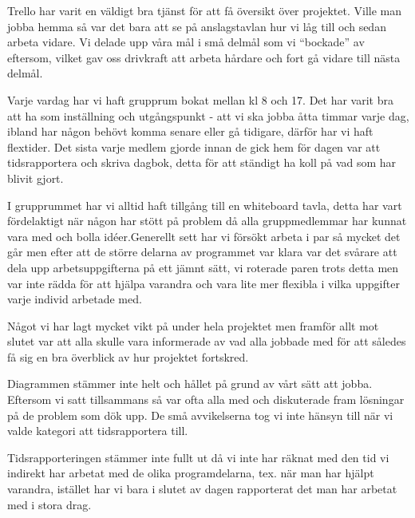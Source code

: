 Trello har varit en väldigt bra tjänst för att få översikt över projektet. Ville man jobba hemma så var det bara att se på anslagstavlan hur vi låg till och sedan arbeta vidare. Vi delade upp våra mål i små delmål som vi “bockade” av eftersom, vilket gav oss drivkraft att arbeta hårdare och fort gå vidare till nästa delmål.


Varje vardag har vi haft grupprum bokat mellan kl 8 och 17. Det har varit bra att ha som inställning och utgångspunkt - att vi ska jobba åtta timmar varje dag, ibland har någon behövt komma senare eller gå tidigare, därför har vi haft flextider. Det sista varje medlem gjorde innan de gick hem för dagen var att tidsrapportera och skriva dagbok, detta för att ständigt ha koll på vad som har blivit gjort.

I grupprummet har vi alltid haft tillgång till en whiteboard tavla, detta har vart fördelaktigt när någon har stött på problem då alla gruppmedlemmar har kunnat vara med och bolla idéer.Generellt sett har vi försökt arbeta i par så mycket det går men efter att de större delarna av programmet var klara var det svårare att dela upp arbetsuppgifterna på ett jämnt sätt, vi roterade paren trots detta men var inte rädda för att hjälpa varandra och vara lite mer flexibla i vilka uppgifter varje individ arbetade med. 

Något vi har lagt mycket vikt på under hela projektet men framför allt mot slutet var att alla skulle vara informerade av vad alla jobbade med för att således få sig en bra överblick av hur projektet fortskred. 

Diagrammen stämmer inte helt och hållet på grund av vårt sätt att jobba. Eftersom vi satt tillsammans så var ofta alla med och diskuterade fram lösningar på de problem som dök upp. De små avvikelserna tog vi inte hänsyn till när vi valde kategori att tidsrapportera till.

Tidsrapporteringen stämmer inte fullt ut då vi inte har räknat med den tid vi indirekt har arbetat med de olika programdelarna, tex. när man har hjälpt varandra, istället har vi bara i slutet av dagen rapporterat det man har arbetat med i stora drag.
